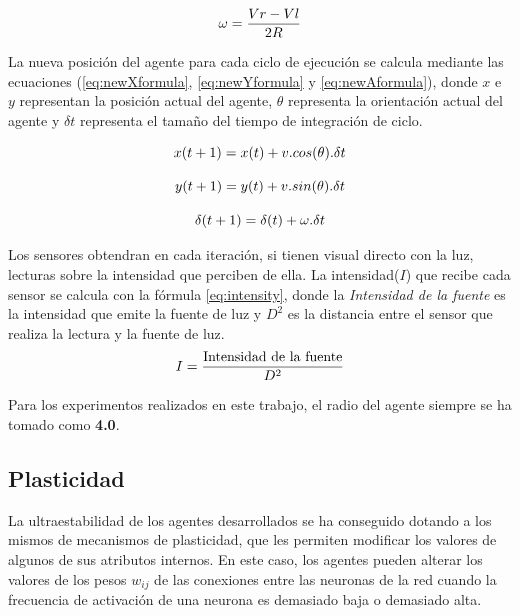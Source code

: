 \begin{equation} \label{eq:WFormula}
 \centering
 \omega = \frac{Vr - Vl}{2R}
\end{equation}

La nueva posición del agente para cada ciclo de ejecución se calcula mediante las ecuaciones (\ref{eq:newXformula}, \ref{eq:newYformula} y \ref{eq:newAformula}), donde $x$ e $y$ representan la posición actual del agente,
$\theta$ representa la orientación actual del agente y $\delta t$ representa el tamaño del tiempo de integración de ciclo.

\begin{equation} \label{eq:newXformula}
 \centering
 x(t + 1) = x(t) + v.cos(\theta).\delta t
\end{equation}

\begin{equation} \label{eq:newYformula}
 \centering
 y(t + 1) = y(t) + v.sin(\theta).\delta t
\end{equation}

\begin{equation} \label{eq:newAformula}
 \centering
 \delta (t + 1) = \delta (t) + \omega .\delta t
\end{equation}

Los sensores obtendran en cada iteración, si tienen visual directo con la luz, lecturas sobre la intensidad que perciben de ella. La intensidad($I$) que recibe cada sensor se calcula con la fórmula \ref{eq:intensity}, donde
la \textit{Intensidad de la fuente} es la intensidad que emite la fuente de luz y $D^{2}$ es la distancia entre el sensor que realiza la lectura y la fuente de luz.
\begin{equation} \label{eq:intensity}
 \centering
 I = \frac{\text{Intensidad de la fuente}}{D^{2}}
\end{equation}

Para los experimentos realizados en este trabajo, el radio del agente siempre se ha tomado como \textbf{4.0}.

\subsection{Plasticidad}
La ultraestabilidad de los agentes desarrollados se ha conseguido dotando a los mismos de mecanismos de plasticidad, que les permiten modificar los valores de algunos de sus atributos internos. En este caso, los agentes pueden
alterar los valores de los pesos $w_{ij}$ de las conexiones entre las neuronas de la red cuando la frecuencia de activación de una neurona es demasiado baja o demasiado alta.

